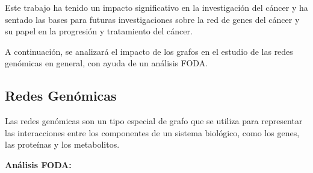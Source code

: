 \documentclass[11pt, a4paper]{article}
\begin{document}
Este trabajo ha tenido un impacto significativo en la investigación del cáncer y ha sentado las bases para futuras investigaciones sobre la red de genes del cáncer y su papel en la progresión y tratamiento del cáncer.

A continuación, se analizará el impacto de los grafos en el estudio de las redes genómicas en general, con ayuda de un análisis FODA.
\vspace{-0.5cm}
\subsection{Redes Genómicas}

Las redes genómicas son un tipo especial de grafo que se utiliza para representar las interacciones entre los componentes de un sistema biológico, como los genes, las proteínas y los metabolitos.

\textbf{Análisis FODA:}
\end{document}

